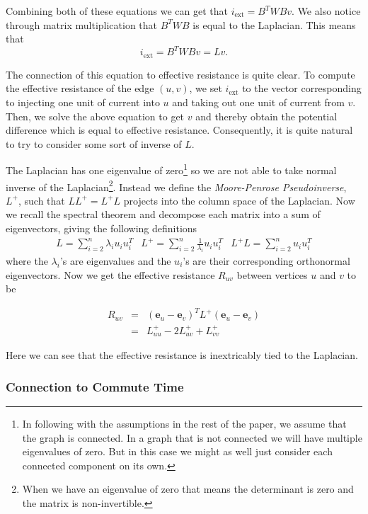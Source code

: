 \documentclass[12pt,twoside]{article}
\newcommand{\mbf}{\mathbf}
\begin{document}
Combining both of these equations we can get that $i_{\text{ext}} = B^TWBv$. We also notice through matrix multiplication that $B^TWB$ is equal to the Laplacian. This means that
%
\begin{equation*}
i_{\text{ext}} = B^TWBv = Lv.
\end{equation*}

The connection of this equation to effective resistance is quite clear. To compute the effective resistance of the edge $(u,v)$, we set $i_{\text{ext}}$ to the vector corresponding to injecting one unit of current into $u$ and taking out one unit of current from $v$. Then, we solve the above equation to get $v$ and thereby obtain the potential difference which is equal to effective resistance. Consequently, it is quite natural to try to consider some sort of inverse of $L$. 

The Laplacian has one eigenvalue of zero\footnote{In following with the assumptions in the rest of the paper, we assume that the graph is connected. In a graph that is not connected we will have multiple eigenvalues of zero. But in this case we might as well just consider each connected component on its own.} so we are not able to take normal inverse of the Laplacian\footnote{When we have an eigenvalue of zero that means the determinant is zero and the matrix is non-invertible.}. Instead we define the \textit{Moore-Penrose Pseudoinverse}, $L^+$, such that $LL^+ = L^+L$ projects into the column space of the Laplacian. Now we recall the spectral theorem and decompose each matrix into a sum of eigenvectors, giving the following definitions
%
\begin{eqnarray}
L = \sum_{i=2}^{n} \lambda_i u_i u_i^T & L^+ = \sum_{i=2}^{n} \frac{1}{\lambda_i} u_i u_i^T & L^+L = \sum_{i=2}^{n} u_i u_i^T
\end{eqnarray}
%
where the $\lambda_i$'s are eigenvalues and the $u_i$'s are their corresponding orthonormal eigenvectors. Now we get the effective resistance $R_{uv}$ between vertices $u$ and $v$ to be 

\begin{eqnarray}
R_{uv} &=& (\mbf{e}_u - \mbf{e}_v)^T L^+ (\mbf{e}_u - \mbf{e}_v) \\
       &=&  L^+_{uu} -2L^+_{uv} + L^+_{vv} 
\end{eqnarray}

Here we can see that the effective resistance is inextricably tied to the Laplacian.

\subsubsection{Connection to Commute Time}
\end{document}
